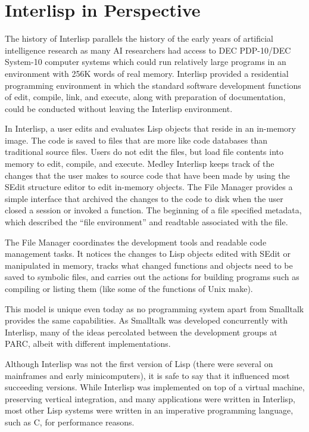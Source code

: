 \documentclass[sigconf]{acmart}
\begin{document}
\section{Interlisp in Perspective}

The history of Interlisp parallels the history of the early years of artificial intelligence research as many AI researchers had access to DEC PDP-10/DEC System-10 computer systems which could run relatively large programs in an environment\cite{Bobrow74} with 256K words of real memory. Interlisp provided a residential programming environment in which the standard software development functions of edit, compile, link, and execute, along with preparation of documentation, could be conducted without leaving the Interlisp environment\cite{Teitelman73}.

In Interlisp, a user edits and evaluates Lisp objects that reside in an in-memory image. The code is saved to files that are more like code databases than traditional source files. Users do not edit the files, but load file contents into memory to edit, compile, and execute. Medley Interlisp keeps track of the changes that the user makes to source code that have been made by using the SEdit structure editor to edit in-memory objects. The File Manager provides a simple interface that archived the changes to the code to disk when the user closed a session or invoked a function. The beginning of a file specified metadata, which described the ``file environment'' and readtable associated with the file.

The File Manager coordinates the development tools and readable code management tasks. It notices the changes to Lisp objects edited with SEdit or manipulated in memory, tracks what changed functions and objects need to be saved to symbolic files, and carries out the actions for building programs such as compiling or listing them (like some of the functions of Unix make).

This model is unique even today as no programming system apart from Smalltalk provides the same capabilities. As Smalltalk was developed concurrently with Interlisp, many of the ideas percolated between the development groups at PARC, albeit with different implementations.

Although Interlisp was not the first version of Lisp (there were several on mainframes and early minicomputers), it is safe to say that it influenced most succeeding versions. While Interlisp was implemented on top of a virtual machine, preserving vertical integration, and many applications were written in Interlisp, most other Lisp systems were written in an imperative programming language, such as C, for performance reasons.
\end{document}
